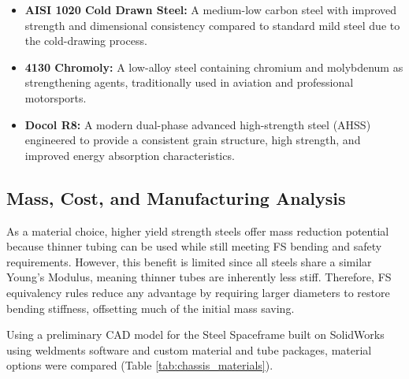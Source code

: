 \documentclass[11pt, a4paper]{report}
\numberwithin{equation}{section}
\begin{document}
\begin{refsection}
\begin{itemize}
    \item \textbf{AISI 1020 Cold Drawn Steel:} A medium-low carbon steel with improved 
    strength and dimensional consistency compared to standard mild steel due to the 
    cold-drawing process. 

    \item \textbf{4130 Chromoly:} A low-alloy steel containing chromium and molybdenum as 
    strengthening agents, traditionally used in aviation and professional motorsports.

    \item \textbf{Docol R8:} A modern dual-phase advanced high-strength steel (AHSS) 
    engineered to provide a consistent grain structure, high strength, and improved 
    energy absorption characteristics.
\end{itemize}
\subsection{Mass, Cost, and Manufacturing Analysis}

As a material choice, higher yield strength steels offer mass reduction potential because thinner tubing can be used while still meeting FS bending and safety requirements. However, this benefit is limited since all steels share a similar Young’s Modulus, meaning thinner tubes are inherently less stiff. Therefore, FS equivalency rules reduce any advantage by requiring larger diameters to restore bending stiffness, offsetting much of the initial mass saving.

Using a preliminary CAD model for the Steel Spaceframe built on SolidWorks using weldments software and custom material and tube packages, material options were compared (Table \ref{tab:chassis_materials}).


\end{refsection}
\end{document}
